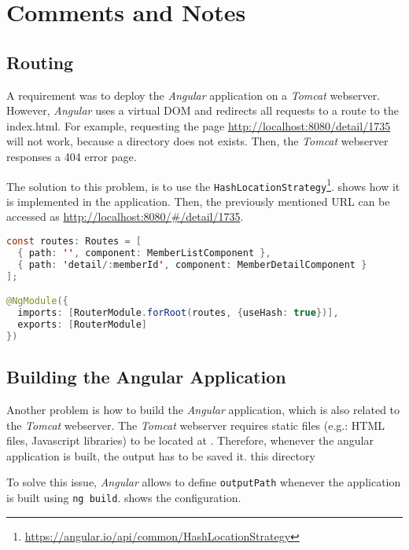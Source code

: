 \section{Comments and Notes}\label{sec:04_comments}


\subsection{Routing}\label{subsec:04_comments_routing}
A requirement was to deploy the \textit{Angular} application on a \textit{Tomcat} webserver. However, \textit{Angular} uses a virtual DOM and redirects all requests to a route to the index.html.
For example, requesting the page \url{http://localhost:8080/detail/1735} will not work, because a directory  does not exists. Then, the \textit{Tomcat} webserver responses a 404 error page.

The solution to this problem, is to use the \texttt{HashLocationStrategy}\footnote{\url{https://angular.io/api/common/HashLocationStrategy}}.  shows how it is implemented in the application.
Then, the previously mentioned URL can be accessed as \url{http://localhost:8080/#/detail/1735}.
\begin{lstlisting}[label=lst:04_comments_routing_hashrouting, caption=Application routing configuration of \texttt{app-routing.module.ts}, language=java]
const routes: Routes = [
  { path: '', component: MemberListComponent },
  { path: 'detail/:memberId', component: MemberDetailComponent }
];

@NgModule({
  imports: [RouterModule.forRoot(routes, {useHash: true})],
  exports: [RouterModule]
})
\end{lstlisting}


\subsection{Building the Angular Application}\label{subsec:04_comments_building}
Another problem is how to build the \textit{Angular} application, which is also related to the \textit{Tomcat} webserver.
The \textit{Tomcat} webserver requires static files (e.g.: HTML files, Javascript libraries) to be located at .
Therefore, whenever the angular application is built, the output has to be saved it. this directory

To solve this issue, \textit{Angular} allows to define \texttt{outputPath} whenever the application is built using \texttt{ng build}.  shows the  configuration.

